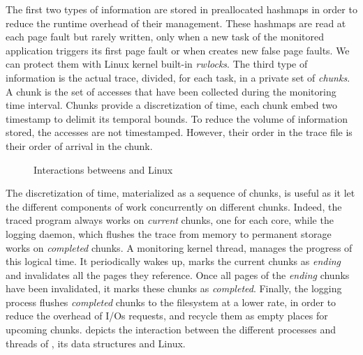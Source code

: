The first two types of information are stored in preallocated hashmaps in order to reduce the
runtime overhead of their management.  These hashmaps are read at each page fault but rarely
written, only when a new task of the monitored application triggers its first page
fault or when \Moca creates new false page faults. We can protect
them with Linux kernel built-in \emph{rwlocks}.
The third type of information is the actual
trace, divided, for each task, in a private set of \emph{chunks}. A chunk is the set of
accesses that have been collected during the monitoring time interval. Chunks provide a discretization
of time, each chunk embed two timestamp to delimit its temporal bounds.
To reduce the volume of information stored, the accesses are not timestamped. However, their order in the trace file is their
order of arrival in the chunk.

\begin{figure}[htb]
    \centering
    \caption{Interactions betweens \Moca and Linux}
    \label{fig:moca}
\end{figure}

The discretization of time, materialized as a sequence of chunks, is useful as it let the
different components of \Moca work concurrently on different chunks.  Indeed, the traced
program always works on \emph{current} chunks, one for each core, while the logging daemon,
which flushes the trace from memory to permanent storage works on \emph{completed} chunks. A
monitoring kernel thread, manages the progress of this logical time. It periodically wakes up, marks the current chunks as
\emph{ending} and invalidates all the pages they reference. Once all pages of the \emph{ending}
chunks have been invalidated, it marks these chunks as \emph{completed}. Finally, the
logging process flushes \emph{completed} chunks to the filesystem at a lower
rate, in order to reduce the overhead of I/Os requests,
and recycle them as empty places for upcoming chunks.   depicts the interaction between the
different processes and threads of \Moca, its data structures and Linux.

